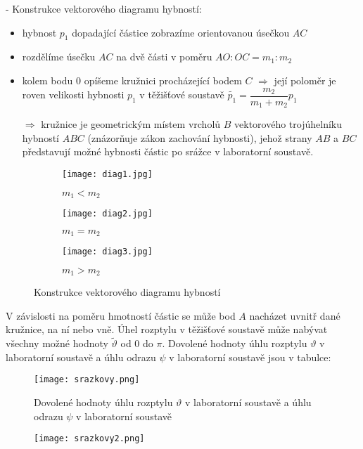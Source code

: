 \documentclass[../../main.tex]{subfiles}
\begin{document}
- Konstrukce vektorového diagramu hybností:
\begin{itemize}
	\item hybnost $p_1$ dopadající částice zobrazíme orientovanou úsečkou $AC$
	\item rozdělíme úsečku $AC$ na dvě části v poměru $AO:OC = m_1:m_2$
	\item kolem bodu 0 opíšeme kružnici procházející bodem $C$ $\Rightarrow$ její poloměr je roven velikosti hybnosti $p_1$ v těžišťové soustavě $\tilde{p_{1}} = \dfrac{m_2}{m_1 + m_2} p_1$
	
	$\Rightarrow$ kružnice je geometrickým místem vrcholů $B$ vektorového trojúhelníku hybností $ABC$ (znázorňuje zákon zachování hybnosti), jehož strany $AB$ a $BC$ představují možné hybnosti částic po srážce v laboratorní soustavě. 

\end{itemize}

\begin{figure}[h!]
	\centering
	\begin{subfigure}[c]{0.3\textwidth}
		\texttt{[image: diag1.jpg]}
		\caption{$m_1 < m_2$}
	\end{subfigure}
	\hfill
	\begin{subfigure}[c]{0.3\textwidth}
		\texttt{[image: diag2.jpg]}
		\caption{$m_1 = m_2$}
	\end{subfigure}
	\hfill
	\begin{subfigure}[c]{0.3\textwidth}
		\texttt{[image: diag3.jpg]}
		\caption{$m_1 > m_2$}
	\end{subfigure}
	\caption{Konstrukce vektorového diagramu hybností}
\end{figure}


V závislosti na poměru hmotností částic se může bod $A$ nacházet uvnitř dané kružnice, na ní nebo 
vně. Úhel rozptylu v těžišťové soustavě může nabývat všechny možné hodnoty  $\tilde{\vartheta}$ od $0$ do $\pi$. Dovolené hodnoty úhlu rozptylu $\vartheta$ v laboratorní soustavě a úhlu odrazu $\psi$ v laboratorní soustavě jsou v tabulce: 

\begin{figure}
	\centering
	\texttt{[image: srazkovy.png]}
	\caption{Dovolené hodnoty úhlu rozptylu $\vartheta$ v laboratorní soustavě a úhlu odrazu $\psi$ v laboratorní soustavě}		
\end{figure}
\begin{figure}
	\centering
	\texttt{[image: srazkovy2.png]}
\end{figure}
\end{document}
